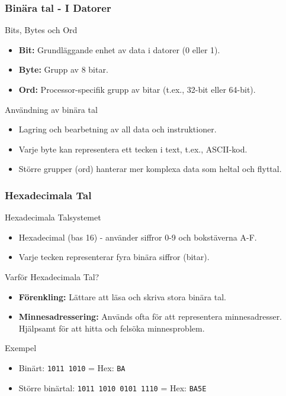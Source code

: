 \begin{frame}[fragile=singleslide]
    \frametitle{Binära tal - I Datorer}
    \begin{block}{Bits, Bytes och Ord}
        \begin{itemize}
            \item \textbf{Bit:} Grundläggande enhet av data i datorer (0 eller 1).
            \item \textbf{Byte:} Grupp av 8 bitar.
            \item \textbf{Ord:} Processor-specifik grupp av bitar (t.ex., 32-bit eller 64-bit).
        \end{itemize}
    \end{block}
    \begin{block}{Användning av binära tal}
        \begin{itemize}
            \item Lagring och bearbetning av all data och instruktioner.
            \item Varje byte kan representera ett tecken i text, t.ex., ASCII-kod.
            \item Större grupper (ord) hanterar mer komplexa data som heltal och flyttal.
        \end{itemize}
    \end{block}
\end{frame}

\begin{frame}[fragile=singleslide]
    \frametitle{Hexadecimala Tal}
    \begin{block}{Hexadecimala Talsystemet}
        \begin{itemize}
            \item Hexadecimal (bas 16) - använder siffror 0-9 och bokstäverna A-F.
            \item Varje tecken representerar fyra binära siffror (bitar).
        \end{itemize}
    \end{block}
    \begin{block}{Varför Hexadecimala Tal?}
        \begin{itemize}
            \item \textbf{Förenkling:} Lättare att läsa och skriva stora binära tal.
            \item \textbf{Minnesadressering:} Används ofta för att representera minnesadresser. Hjälpsamt för att hitta och felsöka minnesproblem.
        \end{itemize}
    \end{block}
    \begin{block}{Exempel}
        \begin{itemize}
            \item Binärt: \texttt{1011 1010} = Hex: \texttt{BA}
            \item Större binärtal: \texttt{1011 1010 0101 1110} = Hex: \texttt{BA5E}
        \end{itemize}
    \end{block}
\end{frame}





